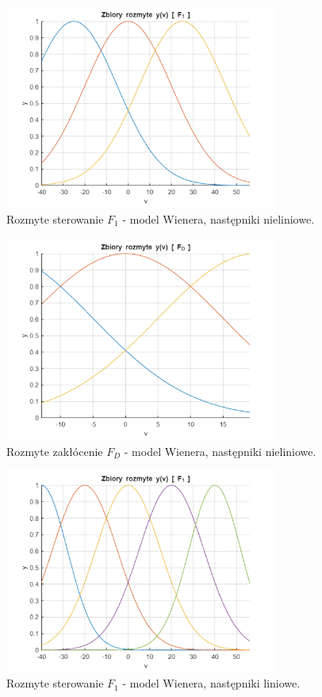 \begin{figure}[h!]
\centering
\includegraphics[width=0.8\textwidth]{pictures/fuzzy_wien_f1}
\caption{Rozmyte sterowanie $F_1$ - model Wienera, następniki nieliniowe.}
\end{figure}

\begin{figure}[h!]
\centering
\includegraphics[width=0.8\textwidth]{pictures/fuzzy_wien_fd}
\caption{Rozmyte zakłócenie $F_D$ - model Wienera, następniki nieliniowe.}
\end{figure}

\newpage

\begin{figure}[h!]
\centering
\includegraphics[width=0.8\textwidth]{pictures/fuzzy_wien_f1_lin}
\caption{Rozmyte sterowanie $F_1$ - model Wienera, następniki liniowe.}
\end{figure}

